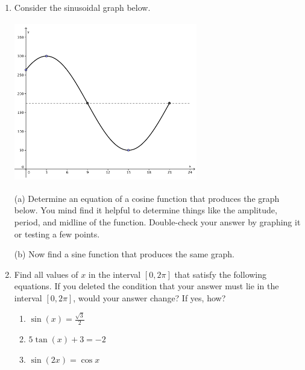 \documentclass[12pt]{article}
\begin{document}
\begin{enumerate}
\vfill
\newpage 
{}

\item Consider the sinusoidal graph below. \\
\noindent\begin{minipage}{0.3\textwidth}%
\includegraphics [height=70mm, width=80mm]{Trig_Sinusoidal}
\end{minipage}%
\hspace{40mm}
\begin{minipage}{0.4\textwidth}
(a) Determine an equation of a cosine function that produces the graph below. You mind find it helpful to determine things like the amplitude, period, and midline of the function. Double-check your answer by graphing it or testing a few points.
\vspace{5mm}

(b) Now find a sine function that produces the same graph.
\end{minipage}
\vfill

\item Find all values of $x$ in the interval $[0, 2\pi]$ that satisfy the following equations. If you deleted the condition that your answer must lie in the interval $[0, 2\pi]$, would your answer change? If yes, how?
	\begin{enumerate}
	\item  $\sin(x)=\frac{\sqrt{3}}{2}$
	\vfill
	\item $5\tan(x)+3=-2$
	\vfill
	\item $\sin(2x) = \cos x$
	\vfill
	\end{enumerate}







\end{enumerate}
\end{document}
